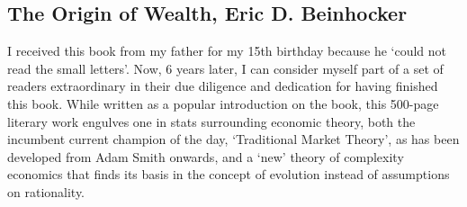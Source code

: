 \subsection{The Origin of Wealth, Eric D. Beinhocker}

I received this book from my father for my 15th birthday because he `could not read the small letters'.
Now, 6 years later, I can consider myself part of a set of readers extraordinary in their due diligence and dedication for having finished this book.
While written as a popular introduction on the book, this 500-page literary work engulves one in stats surrounding economic theory, both the incumbent current champion of the day, `Traditional Market Theory', as has been developed from Adam Smith onwards, and a `new' theory of complexity economics that finds its basis in the concept of evolution instead of assumptions on rationality.

